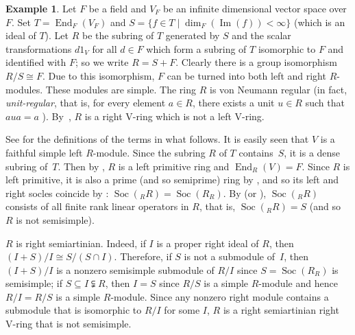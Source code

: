 \documentclass[11pt,a4paper]{amsart}
\theoremstyle{plain}
\theoremstyle{definition}
\newtheorem{example}[theorem]{Example}
\theoremstyle{remark}
\newcommand{\Image}{\operatorname{Im}}
\newcommand{\Soc}{\operatorname{Soc}}
\newcommand{\End}{\operatorname{End}}
\newcommand{\Endomorphism}{\operatorname{End}}
\begin{document}
\begin{example}
Let $F$ be a field and $V_F$ be an infinite dimensional vector space over $F$. Set $T=\Endomorphism_F(V_F)$ and $S= \{ f\in T \mid \dim_F (\Image(f))<\infty \}  $ (which is an ideal of $ T $). Let $R$ be the subring of $T$ generated by $S$ and the scalar transformations $ d 1_{V} $ for all $d \in F$ which form a subring of $ T $ isomorphic to $ F $ and identified with $ F $; so we write $ R=S+F $. Clearly there is a group isomorphism $R / S \cong F$. Due to this isomorphism, $F$ can be turned into both left and right $R$-modules. These modules are simple. The ring $ R $ is von Neumann regular (in fact, \emph{unit-regular}, that is, for every element $a\in R$, there exists a unit $u \in R $ such that $aua=a$ \cite[Proofs of Examples 6.19 and 5.15]{Goodearl:VonNeumannRegularRings}). By~\cite[Example 5.14]{Cozzens-and-Faith:SimpleNoetherianRings}, $R$ is a right V-ring which is not a left V-ring.

See \cite[\S 10,11]{Lam:AFirstCourseInNoncommutativeRingsSecondEdition} for the definitions of the terms in what follows.
It is easily seen that $ V $ is a faithful simple left $ R $-module.
Since the subring  $ R $ of $ T $ contains~$ S $, it is a dense subring of~$ T $.
Then by \cite[Theorem 11.20]{Lam:AFirstCourseInNoncommutativeRingsSecondEdition},
  $ R $ is a left primitive ring  and $ \End_R(V)=F $. Since $ R $ is left primitive, it is also
  a prime (and so semiprime) ring by \cite[Proposition 11.6]{Lam:AFirstCourseInNoncommutativeRingsSecondEdition}, and so its left  and right socles  coincide by \cite[p. 175, last paragraph]{Lam:AFirstCourseInNoncommutativeRingsSecondEdition}: $ \Soc({}_R R) = \Soc(R_R) $.
  By \cite[Ex. 11.18]{Lam:ExercisesInClassicalRingTheorySecondEdition}
(or \cite[Theorem 2.1.25]{Rowen:RingTheoryStudentEdition}), $ \Soc({}_R R) $ consists of all finite rank linear operators in $ R $, that is, $\Soc({}_R R)=S $ (and so $ R $ is not semisimple).



 $ R $
 is
 right semiartinian. Indeed, if $ I $ is a proper right ideal of $ R $, then $ (I+S)/I \cong S / (S\cap I)   $.
  Therefore, if $ S $ is not a submodule of~$ I $, then $ (I+S)/I $ is a nonzero semisimple submodule of $ R/I $ since $ S=\Soc(R_R) $ is semisimple; if $ S\subseteq I \subsetneqq R $, then $ I=S $ since $ R/S $ is a simple $ R $-module and hence $ R/I=R/S $ is a simple $ R $-module. Since any nonzero right module contains a submodule that is isomorphic to $ R/I $ for some $ I $, $ R $ is a right semiartinian right V-ring that is not semisimple.
\end{example}
\end{document}
